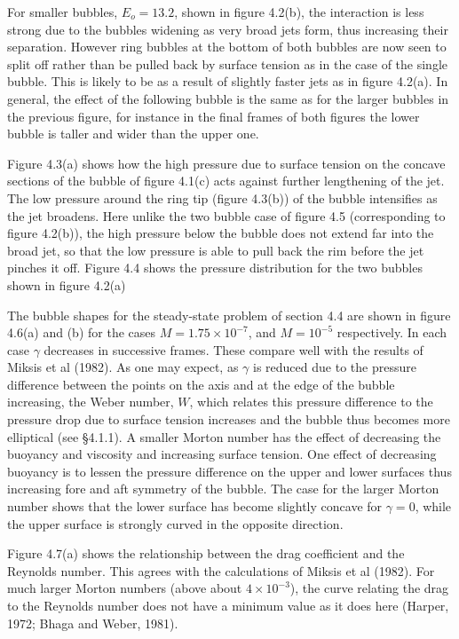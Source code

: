 For smaller bubbles, $E_o=13.2$, shown in 
figure 4.2(b), the interaction is less strong
due to the bubbles widening as very broad jets form, thus
increasing their separation.
However ring bubbles at the bottom of both bubbles are
now seen to split off
rather than be pulled back by surface tension as in the case of the 
single bubble. This is likely to be as a result of slightly faster jets
as in figure 4.2(a).
In general, the effect of the following bubble is the same as for the
larger bubbles in the previous figure, for instance in the final frames
of both figures the lower bubble is taller and wider than the upper one.

Figure 4.3(a) shows how the high pressure due to surface tension
on the concave sections of the bubble of figure 4.1(c)
acts against further lengthening of the jet. The low pressure around the 
ring tip (figure 4.3(b)) of the bubble intensifies as the jet broadens.
Here unlike the two bubble case of figure 4.5 (corresponding to figure
4.2(b)), the high pressure below 
the bubble does not extend far into the broad jet, so that the low pressure 
is able to pull back the rim before the jet pinches it off.
Figure 4.4 shows the pressure distribution for the two bubbles shown in
figure 4.2(a)

The bubble shapes for the steady-state problem of section 4.4
are shown in figure 4.6(a) and (b)
for the cases $M=1.75\times 10^{-7}$, and $M=10^{-5}$
respectively. In each case $\gamma$
decreases in successive frames.
These compare well with the results of Miksis et al (1982).
As one may expect, as $\gamma$
is reduced due to the pressure difference between the points on the
axis and at the edge of the bubble increasing, the Weber number, $W$, 
which relates this pressure difference to the pressure drop due to surface
tension increases and the bubble thus becomes more elliptical
(see \S 4.1.1). A smaller 
Morton number has the effect of decreasing the buoyancy and viscosity and 
increasing surface tension. One effect of decreasing buoyancy is to 
lessen the pressure difference on the 
upper and lower surfaces thus increasing
fore and aft symmetry of the bubble. The case for the larger Morton number 
shows that
the lower surface has become slightly concave for $\gamma=0$, while the upper 
surface is strongly curved in the opposite direction.

Figure 4.7(a) shows the relationship between the drag coefficient and the 
Reynolds number. This agrees with the calculations of Miksis et al 
(1982). For much larger Morton numbers (above about $4\times 10^{-3}$),
the curve relating the drag to the Reynolds number does not
have a minimum value as it does here (Harper, 1972; Bhaga and Weber, 1981).

